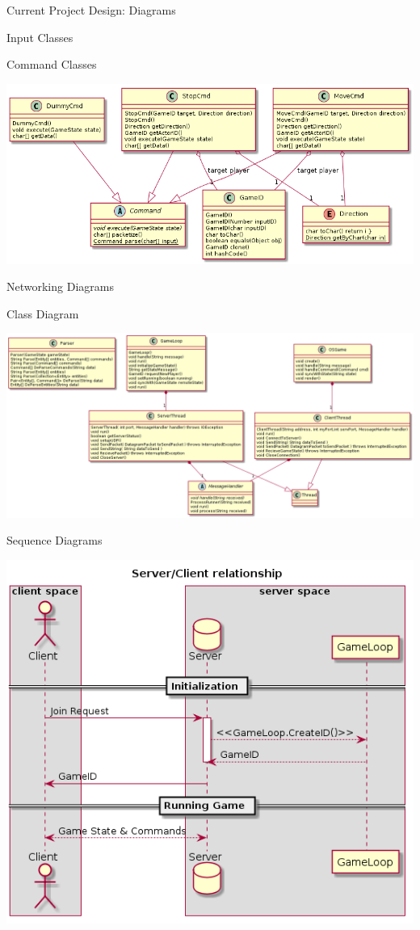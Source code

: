 \documentclass[12pt]{report}
\begin{document}
\begin{chapter}{Current Project Design: Diagrams}
\begin{section}{Input Classes}
   \end{section}
   \begin{section}{Command Classes}
   	\centerline{\includegraphics[width=\textwidth,height=\textheight,keepaspectratio]{./images/commandClasses.png}}
   \end{section}
   \begin{section}{Networking Diagrams}
   	\begin{subsection}{Class Diagram}
       	 \centerline{\includegraphics[width=\textwidth,height=\textheight,keepaspectratio]{./images/networkingClasses.png}}
   	\end{subsection}
   	\begin{subsection}{Sequence Diagrams}
   	 \centerline{\includegraphics[width=\textwidth,height=\textheight,keepaspectratio]{./images/serverClient.png}}

\end{subsection}
\end{section}
\end{chapter}
\end{document}
